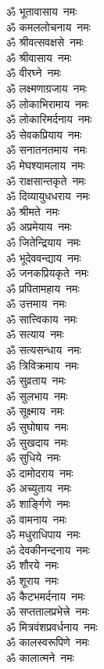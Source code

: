 \begin{multicols}{2}
\begin{flushleft}
ॐ भूतावासाय~नमः\\
ॐ कमललोचनाय~नमः\\
ॐ श्रीवत्सवक्षसे~नमः\\
ॐ श्रीवासाय~नमः\\
ॐ वीरघ्ने~नमः\hfill{}\\
ॐ लक्ष्मणाग्रजाय~नमः\\
ॐ लोकाभिरामाय~नमः\\
ॐ लोकारिमर्दनाय~नमः\\
ॐ सेवकप्रियाय~नमः\\
ॐ सनातनतमाय~नमः\\
ॐ मेघश्यामलाय~नमः\\
ॐ राक्षसान्तकृते~नमः\\
ॐ दिव्यायुधधराय~नमः\\
ॐ श्रीमते~नमः\\
ॐ अप्रमेयाय~नमः\hfill{}\\
ॐ जितेन्द्रियाय~नमः\\
ॐ भूदेववन्द्याय~नमः\\
ॐ जनकप्रियकृते~नमः\\
ॐ प्रपितामहाय~नमः\\
ॐ उत्तमाय~नमः\\
ॐ सात्त्विकाय~नमः\\
ॐ सत्याय~नमः\\
ॐ सत्यसन्धाय~नमः\\
ॐ त्रिविक्रमाय~नमः\\
ॐ सुव्रताय~नमः\hfill{}\\
ॐ सुलभाय~नमः\\
ॐ सूक्ष्माय~नमः\\
ॐ सुघोषाय~नमः\\
ॐ सुखदाय~नमः\\
ॐ सुधिये~नमः\\
ॐ दामोदराय~नमः\\
ॐ अच्युताय~नमः\\
ॐ शार्ङ्गिणे~नमः\\
ॐ वामनाय~नमः\\
ॐ मधुराधिपाय~नमः\hfill{}\\
ॐ देवकीनन्दनाय~नमः\\
ॐ शौरये~नमः\\
ॐ शूराय~नमः\\
ॐ कैटभमर्दनाय~नमः\\
ॐ सप्ततालप्रभेत्त्रे~नमः\\
ॐ मित्रवंशप्रवर्धनाय~नमः\\
ॐ कालस्वरूपिणे~नमः\\
ॐ कालात्मने~नमः\\

\end{flushleft}
\end{multicols}
